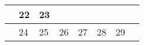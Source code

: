 {\begin{tabularx}{\linewidth}{|l!{\vrule width \myLenLineThicknessThick}*{7}{@{}X@{}|}}
       & 
    
      
      
        \begin{minipage}[t]{6mm}\centering{}22\end{minipage}
      
       & 
    
      
      
        \begin{minipage}[t]{6mm}\centering{}23\end{minipage}
      
      
        \\  \hline 
      
    
  
  
  
  \hyperlink{week-2027-21}{} &
    
      
      
        \begin{minipage}[t]{6mm}\centering{}24\end{minipage}
      
       & 
    
      
      
        \begin{minipage}[t]{6mm}\centering{}25\end{minipage}
      
       & 
    
      
      
        \begin{minipage}[t]{6mm}\centering{}26\end{minipage}
      
       & 
    
      
      
        \begin{minipage}[t]{6mm}\centering{}27\end{minipage}
      
       & 
    
      
      
        \begin{minipage}[t]{6mm}\centering{}28\end{minipage}
      
       & 
    
      
      
        \begin{minipage}[t]{6mm}\centering{}29\end{minipage}
      

\end{tabularx}}
